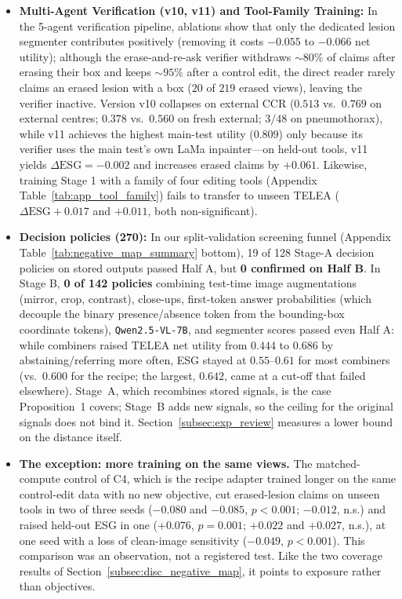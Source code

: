 \documentclass[5p,times,twocolumn,authoryear]{elsarticle}
\begin{document}
\begin{itemize}[leftmargin=*,nosep]
    \item \textbf{Multi-Agent Verification (v10, v11) and Tool-Family Training:} In the 5-agent verification pipeline, ablations show that only the dedicated lesion segmenter contributes positively (removing it costs $-0.055$ to $-0.066$ net utility); although the erase-and-re-ask verifier withdraws $\sim 80\%$ of claims after erasing their box and keeps $\sim 95\%$ after a control edit, the direct reader rarely claims an erased lesion with a box ($20$ of $219$ erased views), leaving the verifier inactive. Version v10 collapses on external CCR ($0.513$ vs.\ $0.769$ on external centres; $0.378$ vs.\ $0.560$ on fresh external; $3/48$ on pneumothorax), while v11 achieves the highest main-test utility ($0.809$) only because its verifier uses the main test's own LaMa inpainter---on held-out tools, v11 yields $\Delta\text{ESG} = -0.002$ and increases erased claims by $+0.061$. Likewise, training Stage 1 with a family of four editing tools (Appendix Table~\ref{tab:app_tool_family}) fails to transfer to unseen TELEA ($\Delta\text{ESG} +0.017$ and $+0.011$, both non-significant).
    \item \textbf{Decision policies (270):} In our split-validation screening funnel (Appendix Table~\ref{tab:negative_map_summary} bottom), 19 of 128 Stage-A decision policies on stored outputs passed Half A, but \textbf{0 confirmed on Half B}. In Stage B, \textbf{0 of 142 policies} combining test-time image augmentations (mirror, crop, contrast), close-ups, first-token answer probabilities (which decouple the binary presence/absence token from the bounding-box coordinate tokens), \texttt{Qwen2.5-VL-7B}, and segmenter scores passed even Half A: while combiners raised TELEA net utility from $0.444$ to $0.686$ by abstaining/referring more often, ESG stayed at $0.55\text{--}0.61$ for most combiners (vs.\ $0.600$ for the recipe; the largest, $0.642$, came at a cut-off that failed elsewhere). Stage~A, which recombines stored signals, is the case Proposition~1 covers; Stage~B adds new signals, so the ceiling for the original signals does not bind it. Section~\ref{subsec:exp_review} measures a lower bound on the distance itself.
    \item \textbf{The exception: more training on the same views.} The matched-compute control of C4, which is the recipe adapter trained longer on the same control-edit data with no new objective, cut erased-lesion claims on unseen tools in two of three seeds ($-0.080$ and $-0.085$, $p<0.001$; $-0.012$, n.s.) and raised held-out ESG in one ($+0.076$, $p=0.001$; $+0.022$ and $+0.027$, n.s.), at one seed with a loss of clean-image sensitivity ($-0.049$, $p<0.001$). This comparison was an observation, not a registered test. Like the two coverage results of Section~\ref{subsec:disc_negative_map}, it points to exposure rather than objectives.
\end{itemize}
\end{document}
